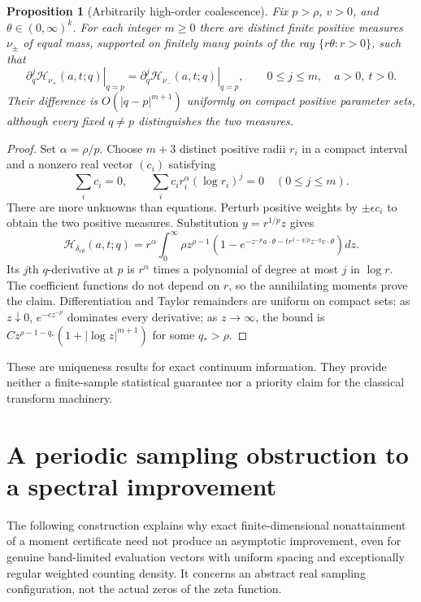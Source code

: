\documentclass[11pt,letterpaper]{article}
\newtheorem{proposition}[theorem]{Proposition}
\theoremstyle{definition}
\theoremstyle{remark}
\newcommand{\1}{\mathbf 1}
\begin{document}
\begin{proposition}[Arbitrarily high-order coalescence]
\label{p06:prop:mp-coalescence}
Fix $p>\rho$, $v>0$, and $\theta\in(0,\infty)^k$.
For each integer $m\ge0$
there are distinct finite positive measures $\nu_\pm$ of equal mass,
supported on finitely many points of the ray $\{r\theta:r>0\}$,
such that
\[
 \left.\partial_q^j\mathcal H_{\nu_+}(a,t;q)\right|_{q=p}
 =\left.\partial_q^j\mathcal H_{\nu_-}(a,t;q)\right|_{q=p},
 \qquad 0\le j\le m,\quad a>0,\ t>0.
\]
Their difference is $O(|q-p|^{m+1})$ uniformly on compact
positive parameter sets, although every fixed $q\ne p$ distinguishes
the two measures.
\end{proposition}
\begin{proof}
Set $\alpha=\rho/p$. Choose $m+3$ distinct positive radii $r_i$
in a compact interval and a nonzero real vector $(c_i)$ satisfying
\[
 \sum_i c_i=0,\qquad
 \sum_i c_i r_i^\alpha(\log r_i)^j=0\quad(0\le j\le m).
\]
There are more unknowns than equations. Perturb positive weights
by $\pm\epsilon c_i$ to obtain the two positive measures.
Substitution $y=r^{1/p}z$ gives
\[
 \mathcal H_{\delta_{r\theta}}(a,t;q)=
 r^\alpha\int_0^\infty\!\rho z^{\rho-1}
 \left(1-e^{-z^{-p}a\cdot\theta
             -t r^{1-q/p}z^{-q}v\cdot\theta}\right)dz.
\]
Its $j$th $q$-derivative at $p$ is $r^\alpha$ times a polynomial
of degree at most $j$ in $\log r$. The coefficient functions do
not depend on $r$, so the annihilating moments prove the claim.
Differentiation and Taylor remainders are uniform on compact sets:
as $z\downarrow0$, $e^{-c z^{-p}}$ dominates every derivative;
as $z\to\infty$, the bound is
$C z^{\rho-1-q_*}(1+|\log z|^{m+1})$ for some $q_*>\rho$.
\end{proof}

These are uniqueness results for exact continuum information.
They provide neither a finite-sample statistical guarantee nor
a priority claim for the classical transform machinery.

\section{A periodic sampling obstruction to a spectral improvement}
\label{p05:sec:periodic-sampling-barrier}

The following construction explains why exact finite-dimensional
nonattainment of a moment certificate need not produce an asymptotic
improvement, even for genuine band-limited evaluation vectors with
uniform spacing and exceptionally regular weighted counting density.
It concerns an abstract real sampling configuration, not the actual
zeros of the zeta function.
\end{document}
